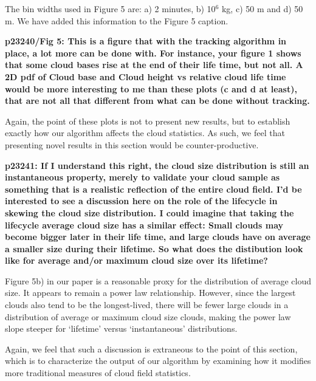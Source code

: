 \documentclass[12pt]{article}
\begin{document}
The bin widths used in Figure 5 are: a) 2 minutes, b) 10$^6$ kg, c) 50 m and 
d) 50 m.  We have added this information to the Figure 5 caption.

\vspace{5mm}

\textbf{p23240/Fig 5: This is a figure that with the tracking algorithm in 
place, a lot more can be done with. For instance, your figure 1 shows that some 
cloud bases rise at the end of their life time, but not all. A 2D pdf of Cloud 
base and Cloud height vs relative cloud life time would be more interesting to 
me than these plots (c and d at least), that are not all that different from 
what can be done without tracking.}

\vspace{5mm}

Again, the point of these plots is not to present new results, but to establish 
exactly how our algorithm affects the cloud statistics.  As such, we feel that 
presenting novel results in this section would be counter-productive.

\vspace{5mm}

\textbf{p23241: If I understand this right, the cloud size distribution is 
still an instantaneous property, merely to validate your cloud sample as 
something that is a realistic reflection of the entire cloud field. I’d be 
interested to see a discussion here on the role of the lifecycle in skewing the 
cloud size distribution. I could imagine that taking the lifecycle average 
cloud size has a similar effect: Small clouds may become bigger later in their 
life time, and large clouds have on average a smaller size during their 
lifetime. So what does the distibution look like for average and/or maximum 
cloud size over its lifetime?}

\vspace{5mm}

Figure 5b) in our paper is a reasonable proxy for the distribution of average 
cloud size.  It appears to remain a power law relationship.  However, since 
the largest clouds also tend to be the longest-lived, there will be fewer 
large clouds in a distribution of average or maximum cloud size clouds, making 
the power law slope steeper for `lifetime' versus `instantaneous' distributions.

Again, we feel that such a discussion is extraneous to the point of this 
section, which is to characterize the output of our algorithm by examining how 
it modifies more traditional measures of cloud field statistics.
\end{document}
